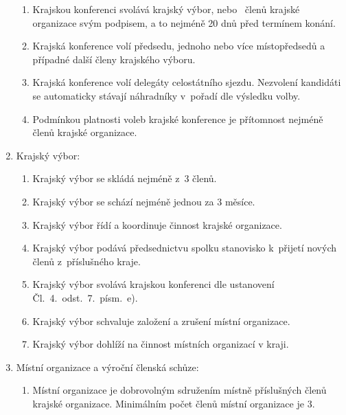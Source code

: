 \documentclass[a4paper]{article}
\begin{document}
\begin{enumerate}
\begin{enumerate}
        \item Krajskou konferenci svolává krajský výbor, nebo
            ~členů krajské organizace svým podpisem, a to
            nejméně 20 dnů před termínem konání.

        \item Krajská konference volí předsedu, jednoho nebo více
            místopředsedů a případné další členy krajského výboru.

        \item Krajská konference volí delegáty celostátního sjezdu. Nezvolení
            kandidáti se automaticky stávají náhradníky v~pořadí dle výsledku
            volby.

        \item Podmínkou platnosti voleb krajské konference je přítomnost
            nejméně  členů krajské organizace.
        \end{enumerate}

    \item Krajský výbor:
        \begin{enumerate}
        \item Krajský výbor se skládá nejméně z~3 členů.

        \item Krajský výbor se schází nejméně jednou za 3 měsíce.

        \item Krajský výbor řídí a koordinuje činnost krajské organizace.

        \item Krajský výbor podává předsednictvu spolku stanovisko k~přijetí
            nových členů z~příslušného kraje.

        \item Krajský výbor svolává krajskou konferenci dle ustanovení
            Čl.~4.~odst.~7.~písm.~e).

        \item Krajský výbor schvaluje založení a zrušení
            místní organizace.

        \item Krajský výbor dohlíží na činnost místních organizací v kraji.

        \end{enumerate}

    \item Místní organizace a výroční členská schůze:
        \begin{enumerate}
        \item Místní organizace je dobrovolným sdružením místně příslušných
            členů krajské organizace. Minimálním počet členů místní organizace
            je 3.


\end{enumerate}
\end{enumerate}
\end{document}
